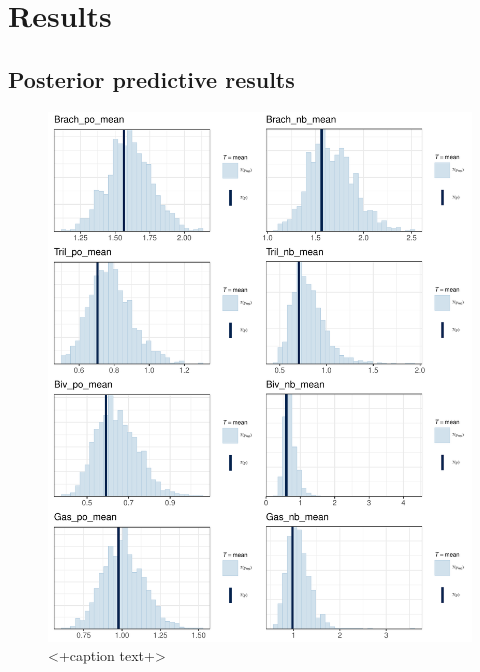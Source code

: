 \documentclass[12pt,letterpaper]{article}
\begin{document}
\section{Results}

\subsection{Posterior predictive results}


\begin{figure}[ht]
  \centering
  \includegraphics[width=\textwidth,height=0.5\textheight,keepaspectratio=true]{figure/ppc_mean}
  \caption{<+caption text+>}
  \label{fig:<+label+>}
\end{figure}
\end{document}
